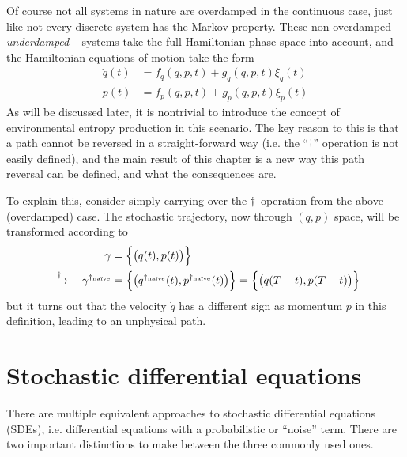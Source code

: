 Of course not all systems in nature are overdamped in the continuous case, just like not every discrete system has the Markov property. These non-overdamped -- \emph{underdamped} -- systems take the full Hamiltonian phase space into account, and the Hamiltonian equations of motion take the form
%
\begin{equation}\begin{split}
	\label{eqn:general hamiltonian equations}
	\dot q(t) &= f_q(q,p,t) + g_q(q,p,t)\xi_q(t) \\
	\dot p(t) &= f_p(q,p,t) + g_p(q,p,t)\xi_p(t)
\end{split}\end{equation}
%
As will be discussed later, it is nontrivial to introduce the concept of environmental entropy production in this scenario. The key reason to this is that a path cannot be reversed in a straight-forward way (i.e. the ``\(\dagger\)'' operation is not easily defined), and the main result of this chapter is a new way this path reversal can be defined, and what the consequences are.

To explain this, consider simply carrying over the \(\dagger\)~operation from the above (overdamped) case. The stochastic trajectory, now through \((q,p)\) space, will be transformed according to
%
\begin{equation}\begin{split}
	\gamma &= \Bigl\{\bigl(q(t),p(t)\bigr)\Bigr\}
	\\ \overset\dagger\longrightarrow \quad
	\gamma^{\dagger_\text{na\"ive}}
		&= \Bigl\{\bigl(q^{\dagger_\text{na\"ive}}(t),p^{\dagger_\text{na\"ive}}(t)\bigr)\Bigr\}
		= \Bigl\{\bigl(q(T-t),p(T-t)\bigr)\Bigr\}
\end{split}\end{equation}
%
but it turns out that the velocity \(\dot q\) has a different sign as momentum \(p\) in this definition, leading to an unphysical path.







\section{Stochastic differential equations}
\label{sec:sde}

There are multiple equivalent approaches to stochastic differential equations (SDEs), i.e. differential equations with a probabilistic or ``noise'' term. There are two important distinctions to make between the three commonly used ones.

